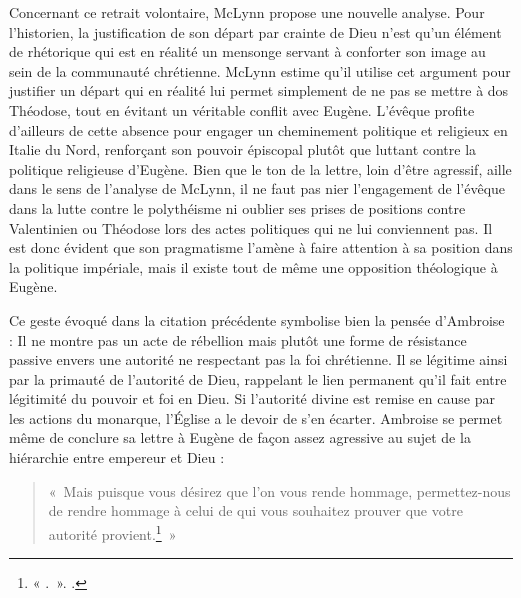 Concernant ce retrait volontaire, McLynn propose une nouvelle analyse. Pour l'historien, la justification de son départ par crainte de Dieu n'est qu'un élément de rhétorique qui est en réalité un mensonge servant à conforter son image au sein de la communauté chrétienne\autocite[345-346]{mclynn_ambrose}. McLynn estime qu'il utilise cet argument pour justifier un départ qui en réalité lui permet simplement de ne pas se mettre à dos Théodose, tout en évitant un véritable conflit avec Eugène. L'évêque profite d'ailleurs de cette absence pour engager un cheminement politique et religieux en Italie du Nord, renforçant son pouvoir épiscopal plutôt que luttant contre la politique religieuse d'Eugène. Bien que le ton de la lettre, loin d'être agressif, aille dans le sens de l'analyse de McLynn, il ne faut pas nier l'engagement de l'évêque dans la lutte contre le polythéisme ni oublier ses prises de positions contre Valentinien ou Théodose lors des actes politiques qui ne lui conviennent pas. Il est donc évident que son pragmatisme l'amène à faire attention à sa position dans la politique impériale, mais il existe tout de même une opposition théologique à Eugène.

\bigskip

Ce geste évoqué dans la citation précédente symbolise bien la pensée d'Ambroise : Il ne montre pas un acte de rébellion mais plutôt une forme de résistance passive envers une autorité ne respectant pas la foi chrétienne. Il se légitime ainsi par la primauté de l’autorité de Dieu, rappelant le lien permanent qu’il fait entre légitimité du pouvoir et foi en Dieu. Si l’autorité divine est remise en cause par les actions du monarque, l’Église a le devoir de s’en écarter. Ambroise se permet même de conclure sa lettre à Eugène de façon assez agressive au sujet de la hiérarchie entre empereur et Dieu :

\bigskip

\begin{quote}
    «~Mais puisque vous désirez que l'on vous rende hommage, permettez-nous de rendre hommage à celui de qui vous souhaitez prouver que votre autorité provient.\footnote{« .~». \cite[\nopp ec. 10, 12]{ambroise_csel_82_3}.}~»
\end{quote}

\bigskip

